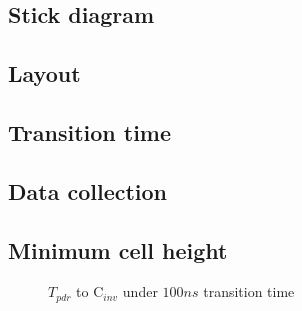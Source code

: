 \documentclass[]{article}
\begin{document}
\subsection{Stick diagram}

\subsection{Layout}

\subsection{Transition time}

\subsection{Data collection}

\subsection{Minimum cell height}

\begin{figure}[H]
	\centering
	\caption{$T_{pdr}$ to $\mathrm{C}_{inv}$ under $100ns$ transition time}
	\label{}
\end{figure}
\end{document}
